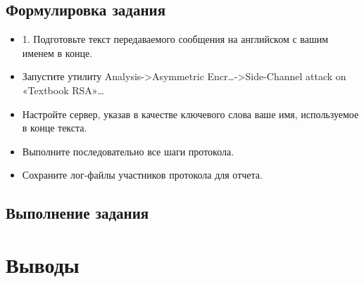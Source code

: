 \documentclass[a4paper, 14pt]{extarticle}
\begin{document}
\subsection{Формулировка задания}
\begin{itemize}
    \item 1. Подготовьте текст передаваемого сообщения на английском с вашим именем в конце.
    \item  Запустите утилиту Analysis->Asymmetric Encr…->Side-Channel attack on «Textbook RSA»…
    \item  Настройте сервер, указав в качестве ключевого слова ваше имя, используемое в конце текста.
    \item  Выполните последовательно все шаги протокола.
    \item  Сохраните лог-файлы участников протокола для отчета.
\end{itemize}

\subsection{Выполнение задания}
\lipsum[1] %

\section{Выводы}
\lipsum[1-4] %
\end{document}
